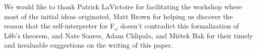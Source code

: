 \acks We would like to thank Patrick LaVictoire for facilitating the
workshop where most of the initial ideas originated, Matt Brown for
helping us discover the reason that the self-interpreter for
F$_\omega$ doesn't contradict this formalization of Lӧb's theorem, and
Nate Soares, Adam Chlipala, and Mi\"etek Bak for their timely and
invaluable suggestions on the writing of this paper.
